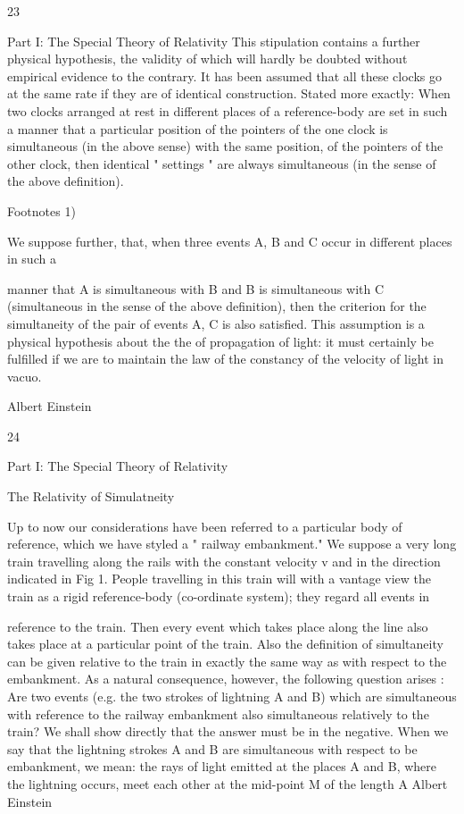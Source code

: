 \documentclass{article}
\begin{document}
23

Part I: The Special Theory of Relativity
This stipulation contains a further physical hypothesis, the validity of which will hardly
be doubted without empirical evidence to the contrary. It has been assumed that all these
clocks go at the same rate if they are of identical construction. Stated more exactly: When
two clocks arranged at rest in different places of a reference-body are set in such a manner
that a particular position of the pointers of the one clock is simultaneous (in the above
sense) with the same position, of the pointers of the other clock, then identical " settings "
are always simultaneous (in the sense of the above definition).

Footnotes
1)

We suppose further, that, when three events A, B and C occur in different places in such a

manner that A is simultaneous with B and B is simultaneous with C (simultaneous in the
sense of the above definition), then the criterion for the simultaneity of the pair of events A,
C is also satisfied. This assumption is a physical hypothesis about the the of propagation of
light: it must certainly be fulfilled if we are to maintain the law of the constancy of the
velocity of light in vacuo.

Albert Einstein

24

Part I: The Special Theory of Relativity

The Relativity of Simulatneity

Up to now our considerations have been referred to a particular body of reference, which
we have styled a " railway embankment." We suppose a very long train travelling along the
rails with the constant velocity v and in the direction indicated in Fig 1. People travelling in
this train will with a vantage view the train as a rigid reference-body (co-ordinate system);
they regard all events in

reference to the train. Then every event which takes place along the line also takes place at
a particular point of the train. Also the definition of simultaneity can be given relative to the
train in exactly the same way as with respect to the embankment. As a natural consequence,
however, the following question arises :
Are two events (e.g. the two strokes of lightning A and B)
which are simultaneous with reference to the railway embankment
also simultaneous relatively to the train? We shall show directly
that the answer must be in the negative.
When we say that the lightning strokes A and B are simultaneous with respect to be
embankment, we mean: the rays of light emitted at the places A and B, where the lightning
occurs, meet each other at the mid-point M of the length A
Albert Einstein
\end{document}
